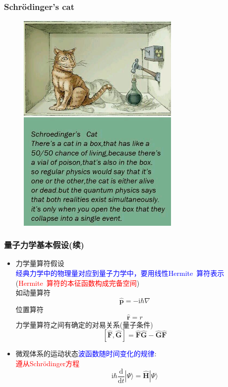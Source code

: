 \documentclass[cjk,slidestop,compress,mathserif,blue]{beamer}
\begin{document}
\frame
{
	\frametitle{Schr\"odinger's cat}
\begin{figure}[h!]
\centering
\vspace{-10.5pt}
\includegraphics[height=0.70\textwidth,width=0.7\textwidth,viewport=0 0 760 750,clip]{Figures/Schrodinger-cat.jpg}
\label{Schrodinger-cat}
\end{figure}
}

\frame
{
	\frametitle{量子力学基本假设(续)}
	\begin{itemize}
		\item 力学量算符假设\\
			\textcolor{blue}{经典力学中的物理量对应到量子力学中，要用线性\textrm{Hermite~}算符表示}(\textcolor{red}{\textrm{Hermite~}算符的本征函数构成完备空间})\\
			如动量算符 
			$$\hat{\mathbf{p}}=-\mathrm{i}\hbar\nabla$$
			位置算符$$\hat{\mathbf r}=r$$
			力学量算符之间有确定的对易关系(量子条件)
			$$[\hat{\mathbf F},\hat{\mathbf G}]=\hat{\mathbf F}\hat{\mathbf G}-\hat{\mathbf G}\hat{\mathbf F}$$ 
			
		\item 微观体系的运动状态\textcolor{blue}{波函数随时间变化的规律}:\\\textcolor{red}{遵从\textrm{Schr\"odinger}方程}
			$$\mathrm{i}\hbar\dfrac{\mathrm{d}}{\mathrm{d}t}|\Psi\rangle=\hat{\mathbf H}|\Psi\rangle$$
	\end{itemize}
}
\end{document}
